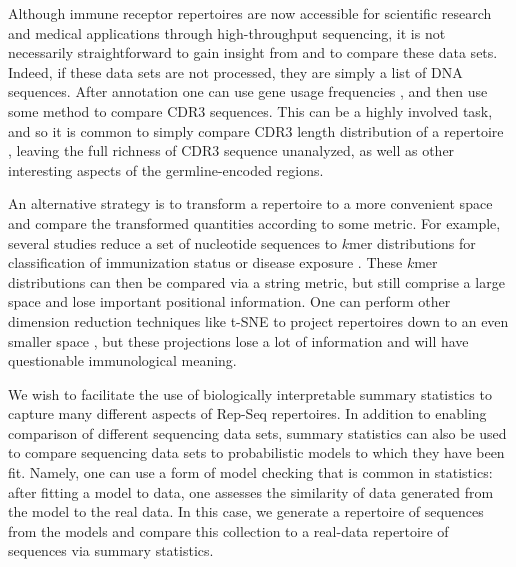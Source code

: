 \documentclass{article}
\begin{document}
Although immune receptor repertoires are now accessible for scientific research and medical applications through high-throughput sequencing, it is not necessarily straightforward to gain insight from and to compare these data sets.
Indeed, if these data sets are not processed, they are simply a list of DNA sequences.
After annotation one can use gene usage frequencies \cite{Hou2016-qc, Martin2015-ho, Corcoran2016-nw, Gadala2015-wq, Boyd2010-hd, Bolen2017-xt}, and then use some method to compare CDR3 sequences.
This can be a highly involved task, and so it is common to simply compare CDR3 length distribution of a repertoire \cite{Miqueu2007-lk,Larimore2012-lo}, leaving the full richness of CDR3 sequence unanalyzed, as well as other interesting aspects of the germline-encoded regions.

An alternative strategy is to transform a repertoire to a more convenient space and compare the transformed quantities according to some metric.
For example, several studies reduce a set of nucleotide sequences to $k$mer distributions for classification of immunization status or disease exposure \cite{Madi2014-lt, Ostmeyer2017-xg, Heather2017pf}.
These $k$mer distributions can then be compared via a string metric, but still comprise a large space and lose important positional information.
One can perform other dimension reduction techniques like t-SNE to project repertoires down to an even smaller space \cite{Yokota2017-zm}, but these projections lose a lot of information and will have questionable immunological meaning.

We wish to facilitate the use of biologically interpretable summary statistics to capture many different aspects of Rep-Seq repertoires.
In addition to enabling comparison of different sequencing data sets, summary statistics can also be used to compare sequencing data sets to probabilistic models to which they have been fit.
Namely, one can use a form of model checking that is common in statistics: after fitting a model to data, one assesses the similarity of data generated from the model to the real data.
In this case, we generate a repertoire of sequences from the models and compare this collection to a real-data repertoire of sequences via summary statistics.
\end{document}
